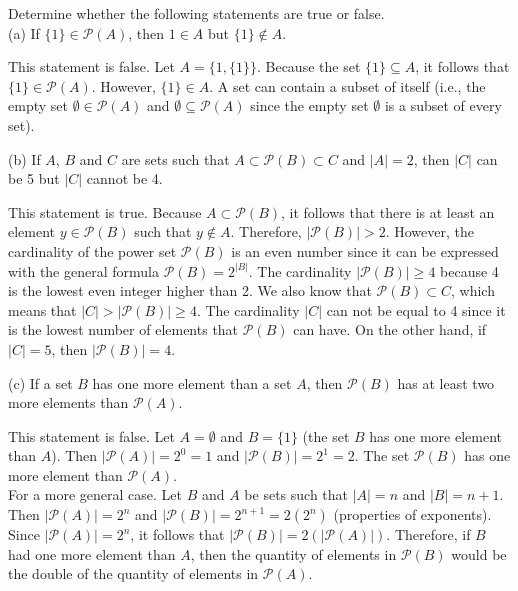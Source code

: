 \documentclass[12pt]{article}
\newenvironment{problem}[2][Problem]{\begin{trivlist}
		\item[\hskip \labelsep {\bfseries #1}\hskip \labelsep {\bfseries #2.}]}{\end{trivlist}}
\newenvironment{solution}[2][Solution]{\begin{trivlist}
		\item[\hskip \labelsep {\bfseries #1}\hskip \labelsep {\bfseries #2.}]}{\end{trivlist}}
\begin{document}
\begin{problem}{20}
Determine whether the following statements are true or false.\\

(a) If $\{1\}\in \mathcal{P}(A)$, then $1\in A$ but $\{1\}\notin A.$
\begin{solution}{a}
	This statement is false. Let $A=\{1,\{1\}\}$. Because the set $\{1\}\subseteq A$, it follows that $\{1\}\in \mathcal{P}(A)$. However, $\{1\}\in A$. A set can contain a subset of itself (i.e., the empty set $\emptyset \in \mathcal{P}(A)$ and $\emptyset \subseteq \mathcal{P}(A)$ since the empty set $\emptyset$ is a subset of every set).
\end{solution}
(b) If $A$, $B$ and $C$ are sets such that $A\subset \mathcal{P}(B)\subset C$ and $|A|=2$, then $|C|$ can be 5 but $|C|$ cannot be 4.
\begin{solution}{b}
	This statement is true. Because $A\subset \mathcal{P}(B)$, it follows that there is at least an element $y\in \mathcal{P}(B)$ such that $y\notin A$. Therefore, $|\mathcal{P}(B)|>2$. However, the cardinality of the power set $\mathcal{P}(B)$ is an even number since it can be expressed with the general formula $\mathcal{P}(B)=2^{|B|}$. The cardinality $|\mathcal{P}(B)|\geq 4$ because 4 is the lowest even integer higher than 2. We also know that $\mathcal{P}(B)\subset C$, which means that $|C|>|\mathcal{P}(B)|\geq 4$. The cardinality $|C|$ can not be equal to 4 since it is the lowest number of elements that $\mathcal{P}(B)$ can have. On the other hand, if $|C|=5$, then $|\mathcal{P}(B)|=4$.
\end{solution}
(c) If a set $B$ has one more element than a set $A$, then $\mathcal{P}(B)$ has at least two more elements than $\mathcal{P}(A)$.
\begin{solution}{c}
	This statement is false. Let $A=\emptyset$ and $B=\{1\}$ (the set $B$ has one more element than $A$). Then $|\mathcal{P}(A)|=2^{0}=1$ and $|\mathcal{P}(B)|=2^{1}=2$. The set $\mathcal{P}(B)$ has one more element than $\mathcal{P}(A)$. \\
	For a more general case. Let $B$ and $A$ be sets such that $|A|=n$ and $|B|=n+1$. Then $|\mathcal{P}(A)|=2^{n}$ and  $|\mathcal{P}(B)|=2^{n+1}=2(2^{n})$ (properties of exponents). Since $|\mathcal{P}(A)|=2^{n}$, it follows that $|\mathcal{P}(B)|= 2(|\mathcal{P}(A)|)$. Therefore, if $B$ had one more element than $A$, then the quantity of elements in $\mathcal{P}(B)$ would be the double of the quantity of elements in $\mathcal{P}(A)$. 
\end{solution}

\end{problem}
\end{document}
